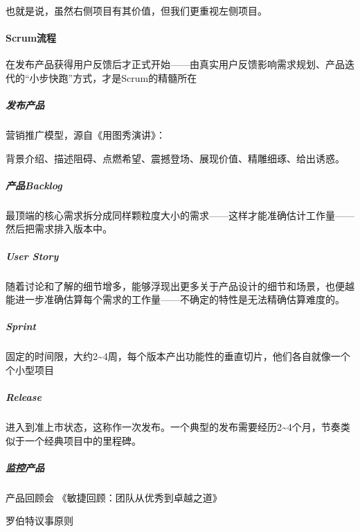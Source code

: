 \documentclass[letterpaper,10pt,english]{sphinxmanual}
\begin{document}
也就是说，虽然右侧项目有其价值，但我们更重视左侧项目。
%
\begin{footnote}[813]\sphinxAtStartFootnote
{}
%
\end{footnote}


\paragraph{Scrum流程}
\label{\detokenize{chapter_project/Scrum:id4}}
在发布产品获得用户反馈后才正式开始——由真实用户反馈影响需求规划、产品迭代的“小步快跑”方式，才是Scrum的精髓所在


\subparagraph{发布产品}
\label{\detokenize{chapter_project/Scrum:id5}}
营销推广模型，源自《用图秀演讲》：

背景介绍、描述阻碍、点燃希望、震撼登场、展现价值、精雕细琢、给出诱惑。
%
\begin{footnote}[814]\sphinxAtStartFootnote
{}
%
\end{footnote}


\subparagraph{产品Backlog}
\label{\detokenize{chapter_project/Scrum:backlog}}
最顶端的核心需求拆分成同样颗粒度大小的需求——这样才能准确估计工作量——然后把需求排入版本中。


\subparagraph{User Story}
\label{\detokenize{chapter_project/Scrum:user-story}}
随着讨论和了解的细节增多，能够浮现出更多关于产品设计的细节和场景，也便越能进一步准确估算每个需求的工作量——不确定的特性是无法精确估算难度的。


\subparagraph{Sprint}
\label{\detokenize{chapter_project/Scrum:sprint}}
固定的时间限，大约2\textasciitilde{}4周，每个版本产出功能性的垂直切片，他们各自就像一个个小型项目


\subparagraph{Release}
\label{\detokenize{chapter_project/Scrum:release}}
进入到准上市状态，这称作一次发布。一个典型的发布需要经历2\textasciitilde{}4个月，节奏类似于一个经典项目中的里程碑。


\subparagraph{监控产品}
\label{\detokenize{chapter_project/Scrum:id6}}
产品回顾会 《敏捷回顾：团队从优秀到卓越之道》

罗伯特议事原则
\end{document}
